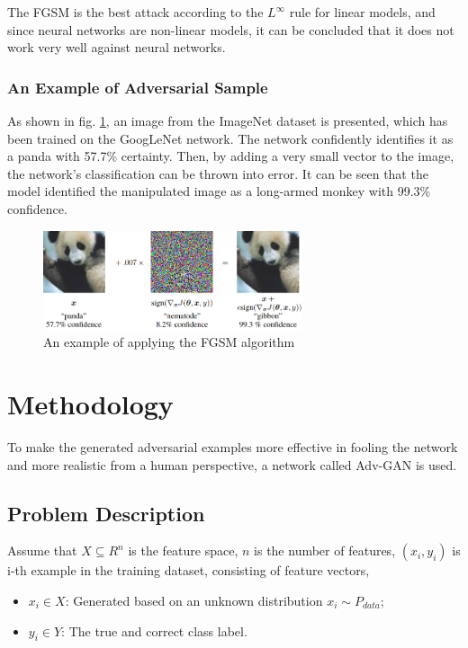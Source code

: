 \documentclass[lettersize,journal]{IEEEtran}
\begin{document}
The FGSM is the best attack according to the $L^\infty$ rule for linear models, and since neural networks are non-linear models, it can be concluded that it does not work very well against neural networks.

\subsubsection*{An Example of Adversarial Sample}

As shown in fig. \ref{fgsmEx}, an image from the ImageNet dataset is presented, which has been trained on the GoogLeNet network. The network confidently identifies it as a panda with 57.7\% certainty. Then, by adding a very small vector to the image, the network's classification can be thrown into error. It can be seen that the model identified the manipulated image as a long-armed monkey with 99.3\% confidence.
\begin{figure}[!t]
\centering
\includegraphics[width=3in]{fgsmEx.PNG}
\caption{An example of applying the FGSM algorithm \cite{Goodfellow2015ExplainingAH}}
\label{fgsmEx}
\end{figure}

\section{Methodology}
To make the generated adversarial examples more effective in fooling the network and more realistic from a human perspective, a network called Adv-GAN \cite{Xiao2018GeneratingAE} is used.

\subsection*{Problem Description}
Assume that $X \subseteq R^n$ is the feature space, $n$ is the number of features, $(x_i, y_i)$ is i-th example in the training dataset, consisting of feature vectors,
\begin{itemize}
\item $x_i \in X$: Generated based on an unknown distribution $x_i \sim P_{data}$;
\item $y_i \in Y$: The true and correct class label.
\end{itemize}
\end{document}
